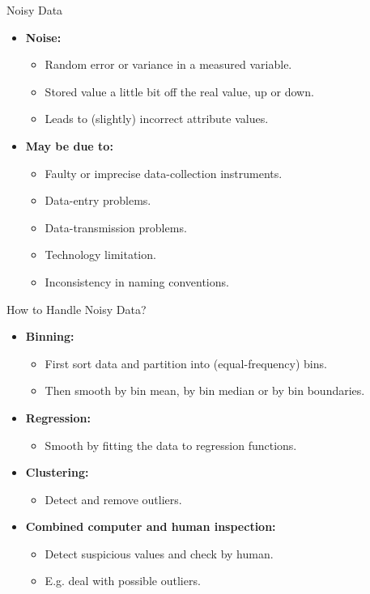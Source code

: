 \begin{frame}{Noisy Data}
	\begin{itemize}
		\item \textbf{\color{airforceblue}Noise:}
		\begin{itemize}
			\item Random error or variance in a measured variable.
			\item Stored value a little bit off the real value, up or down.
			\item Leads to (slightly) incorrect attribute values.
		\end{itemize}
		\item \textbf{May be due to:}
		\begin{itemize}
			\item Faulty or imprecise data-collection instruments.
			\item Data-entry problems.
			\item Data-transmission problems.
			\item Technology limitation.
			\item Inconsistency in naming conventions.
		\end{itemize}
	\end{itemize}
\end{frame}

\begin{frame}{How to Handle Noisy Data?}
	\begin{itemize}
		\item \textbf{Binning:}
		\begin{itemize}
			\item First sort data and partition into (equal-frequency) bins.
			\item Then smooth by bin mean, by bin median or by bin boundaries.
		\end{itemize}
		\item \textbf{Regression:}
		\begin{itemize}
			\item Smooth by fitting the data to regression functions.
		\end{itemize}
		\item \textbf{Clustering:}
		\begin{itemize}
			\item Detect and remove outliers.
		\end{itemize}
		\item \textbf{Combined computer and human inspection:}
		\begin{itemize}
			\item Detect suspicious values and check by human.
			\item E.g. deal with possible outliers.
		\end{itemize}
	\end{itemize}
\end{frame}

